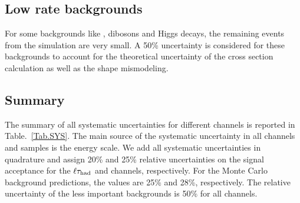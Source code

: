 \subsection{Low rate backgrounds} For some backgrounds like \ttbar, dibosons and Higgs decays, the remaining 
events from the simulation are very small. A 50\% uncertainty is considered for these backgrounds to account for the theoretical uncertainty of the
cross section calculation as well as the shape mismodeling.

\subsection{Summary}
The summary of all systematic uncertainties for different channels is reported in Table.~\ref{Tab.SYS}. The main source of the systematic uncertainty in all channels and samples is the \hadtau energy scale.  We add all systematic uncertainties in quadrature and assign 
 20\% and 25\% relative uncertainties on the signal
acceptance for the $\ell\tau_{\rm had}$ and \tauTau channels, respectively. For the Monte Carlo background predictions, the values are 
25\% and 28\%, respectively. The relative uncertainty of the less important backgrounds is 50\% for all channels.


